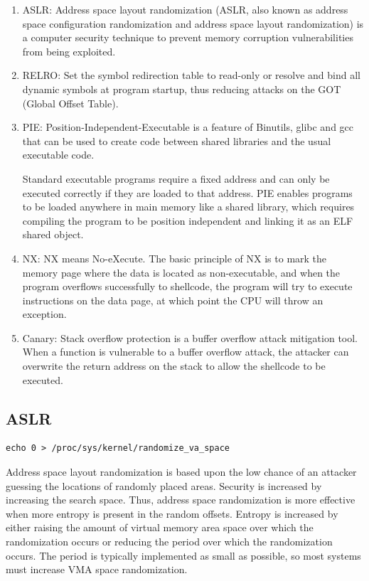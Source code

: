 \documentclass[a4paper]{exam}
\theoremstyle{definition}
\begin{document}
\begin{enumerate}
    \item ASLR: Address space layout randomization (ASLR, also known as address space configuration randomization and address space layout randomization) is a computer security technique to prevent memory corruption vulnerabilities from being exploited.
    \item RELRO: Set the symbol redirection table to read-only or resolve and bind all dynamic symbols at program startup, thus reducing attacks on the GOT (Global Offset Table).
\item PIE: Position-Independent-Executable is a feature of Binutils, glibc and gcc that can be used to create code between shared libraries and the usual executable code.

Standard executable programs require a fixed address and can only be executed correctly if they are loaded to that address. PIE enables programs to be loaded anywhere in main memory like a shared library, which requires compiling the program to be position independent and linking it as an ELF shared object.
\item NX: NX means No-eXecute. The basic principle of NX is to mark the memory page where the data is located as non-executable, and when the program overflows successfully to shellcode, the program will try to execute instructions on the data page, at which point the CPU will throw an exception.
\item Canary: Stack overflow protection is a buffer overflow attack mitigation tool. When a function is vulnerable to a buffer overflow attack, the attacker can overwrite the return address on the stack to allow the shellcode to be executed.
\end{enumerate}

\subsection{ASLR}
\begin{verbatim}
echo 0 > /proc/sys/kernel/randomize_va_space
\end{verbatim}

Address space layout randomization is based upon the low chance of an attacker guessing the locations of randomly placed areas. Security is increased by increasing the search space. Thus, address space randomization is more effective when more entropy is present in the random offsets. Entropy is increased by either raising the amount of virtual memory area space over which the randomization occurs or reducing the period over which the randomization occurs. The period is typically implemented as small as possible, so most systems must increase VMA space randomization.
\end{document}
